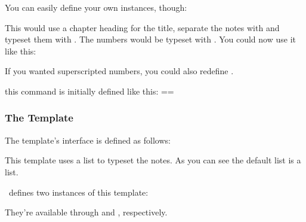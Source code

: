 \documentclass[load-preamble+]{cnltx-doc}
\begin{document}
You can easily define your own instances, though:
This would use a chapter heading for the title, separate the notes with
 and typeset them with .  The numbers would
be typeset with .  You could now use it like this:
\begin{sourcecode}
  \printendnotes[custom]
\end{sourcecode}

If you wanted superscripted numbers, you could also redefine . 
\begin{commands}
    this command is initially defined like this:
    \verbcode=\newcommand*\enmark[1]{#1.}=
\end{commands}

\subsubsection{The  Template}
The  template's interface is defined as follows:
This template uses a list to typeset the notes.  As you can see the default
list is a  list.

\enotez\ defines two instances of this template:
\begin{sourcecode}
\end{sourcecode}
They're available through  and
, respectively.
\end{document}
